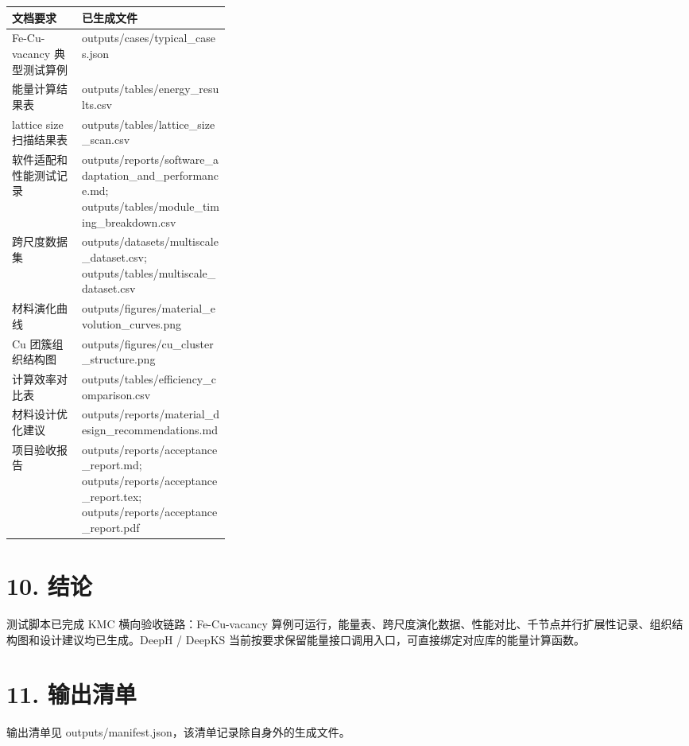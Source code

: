 \documentclass[UTF8,11pt,fontset=none]{ctexart}
\renewcommand{\arraystretch}{1.18}
\begin{document}
\begin{center}
\small
\renewcommand{\arraystretch}{1.30}
\begin{tabularx}{\linewidth}{L{0.32\linewidth}Y}
\hline
{}
\textbf{文档要求} & \textbf{已生成文件} \\
\hline
Fe-Cu-vacancy 典型测试算例 & outputs/cases/typical\_cases.json \\
\hline
能量计算结果表 & outputs/tables/energy\_results.csv \\
\hline
lattice size 扫描结果表 & outputs/tables/lattice\_size\_scan.csv \\
\hline
软件适配和性能测试记录 & outputs/reports/software\_adaptation\_and\_performance.md; outputs/tables/module\_timing\_breakdown.csv \\
\hline
跨尺度数据集 & outputs/datasets/multiscale\_dataset.csv; outputs/tables/multiscale\_dataset.csv \\
\hline
材料演化曲线 & outputs/figures/material\_evolution\_curves.png \\
\hline
Cu 团簇组织结构图 & outputs/figures/cu\_cluster\_structure.png \\
\hline
计算效率对比表 & outputs/tables/efficiency\_comparison.csv \\
\hline
材料设计优化建议 & outputs/reports/material\_design\_recommendations.md \\
\hline
项目验收报告 & outputs/reports/acceptance\_report.md; outputs/reports/acceptance\_report.tex; outputs/reports/acceptance\_report.pdf \\
\hline
\end{tabularx}
\end{center}

\section*{10. 结论}
测试脚本已完成 KMC 横向验收链路：Fe-Cu-vacancy 算例可运行，能量表、跨尺度演化数据、性能对比、千节点并行扩展性记录、组织结构图和设计建议均已生成。DeepH / DeepKS 当前按要求保留能量接口调用入口，可直接绑定对应库的能量计算函数。

\section*{11. 输出清单}
输出清单见 outputs/manifest.json，该清单记录除自身外的生成文件。
\end{document}
